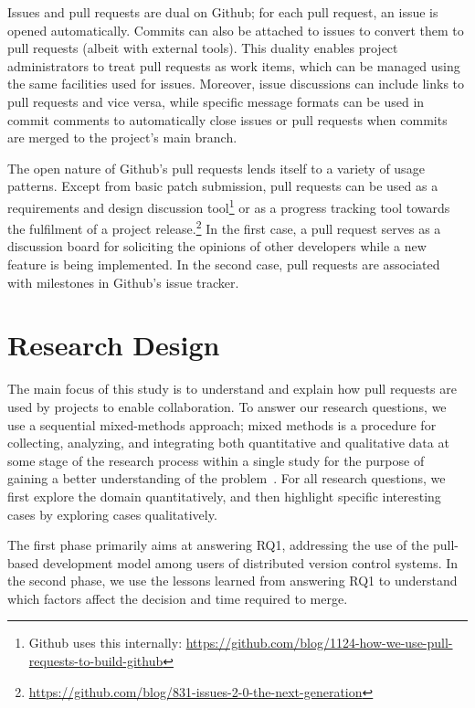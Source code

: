 \documentclass{sig-alternate}
\begin{document}
Issues and pull requests are dual on Github; for each pull request, an issue is
opened automatically. Commits can also be attached to issues to convert them to
pull requests (albeit with external tools). This duality enables project administrators to treat pull requests as work items, which can be managed using the same facilities used for issues. Moreover, issue discussions can include
links to pull requests and vice versa, while specific message formats can be used
in commit comments to automatically close issues or pull requests when commits
are merged to the project's main branch.

The open nature of Github's pull requests lends itself to a variety of usage
patterns. Except from basic patch submission, pull requests can be used as a
requirements and design discussion tool\footnote{Github uses this internally:
\url{https://github.com/blog/1124-how-we-use-pull-requests-to-build-github}} or
as a progress tracking tool towards the fulfilment of a project
release.\footnote{\url{https://github.com/blog/831-issues-2-0-the-next-generation}} In
the first case, a pull request serves as a discussion board for soliciting the
opinions of other developers while a new feature is being implemented. In the
second case, pull requests are associated with milestones in Github's issue
tracker.

\section{Research Design}

The main focus of this study is to understand and explain how pull requests are
used by projects to enable collaboration. To answer our research questions, we
use a sequential mixed-methods approach; mixed methods is a procedure for
collecting, analyzing, and integrating both quantitative and qualitative data at
some stage of the research process within a single study for the purpose of
gaining a better understanding of the problem~\cite{Ivank06}. For all 
research questions, we first explore the domain quantitatively,
and then highlight specific interesting cases by exploring cases qualitatively.

The first phase primarily aims at answering RQ1, addressing the use of the
pull-based development model among users of distributed version control systems.
In the second phase, we use the lessons learned from answering RQ1 to understand
which factors affect the decision and time required to merge.
\end{document}
